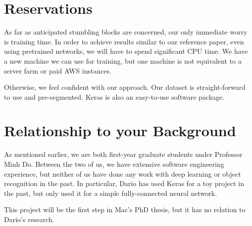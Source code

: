 \documentclass[paper=letter, fontsize=12pt]{article}
\begin{document}
\section{Reservations}

As far as anticipated stumbling blocks are concerned, our only immediate worry
is training time. In order to achieve results similar to our reference paper,
even using pretrained networks, we will have to spend significant CPU time. We
have a new machine we can use for training, but one machine is not equivalent to
a server farm or paid AWS instances.

Otherwise, we feel confident with our approach. Our dataset is straight-forward
to use and pre-segmented. Keras is also an easy-to-use software package.


\section{Relationship to your Background}

As mentioned earlier, we are both first-year graduate students under Professor
Minh Do. Between the two of us, we have extensive software engineering experience, but neither of us have done any work with deep learning or object recognition in the past. In particular, Dario has used Keras for a toy project in the past, but only used it for a simple fully-connected neural network.

This project will be the first step in Mac's PhD thesis, but it has no relation to Dario's research. 






\end{document}

